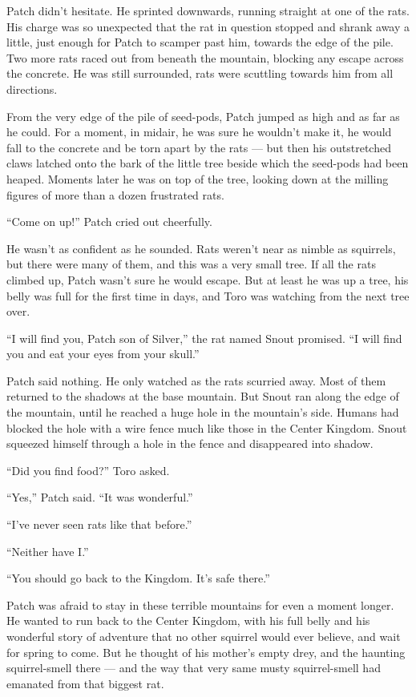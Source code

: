 \documentclass[ebook,oneside,openany,12pt]{memoir}
\begin{document}
Patch didn’t hesitate. He sprinted downwards, running straight at one
of the rats. His charge was so unexpected that the rat in question
stopped and shrank away a little, just enough for Patch to scamper
past him, towards the edge of the pile. Two more rats raced out from
beneath the mountain, blocking any escape across the concrete. He was
still surrounded, rats were scuttling towards him from all directions.

From the very edge of the pile of seed-pods, Patch jumped as high and
as far as he could. For a moment, in midair, he was sure he wouldn’t
make it, he would fall to the concrete and be torn apart by the rats —
but then his outstretched claws latched onto the bark of the little
tree beside which the seed-pods had been heaped. Moments later he was
on top of the tree, looking down at the milling figures of more than a
dozen frustrated rats.

“Come on up!” Patch cried out cheerfully.

He wasn’t as confident as he sounded. Rats weren’t near as nimble as
squirrels, but there were many of them, and this was a very small
tree. If all the rats climbed up, Patch wasn’t sure he would
escape. But at least he was up a tree, his belly was full for the
first time in days, and Toro was watching from the next tree over.

“I will find you, Patch son of Silver,” the rat named Snout
promised. “I will find you and eat your eyes from your skull.”

Patch said nothing. He only watched as the rats scurried away. Most of
them returned to the shadows at the base mountain. But Snout ran along
the edge of the mountain, until he reached a huge hole in the
mountain’s side. Humans had blocked the hole with a wire fence much
like those in the Center Kingdom. Snout squeezed himself through a
hole in the fence and disappeared into shadow.

“Did you find food?” Toro asked.

“Yes,” Patch said. “It was wonderful.”

“I’ve never seen rats like that before.”

“Neither have I.”

“You should go back to the Kingdom. It’s safe there.”

Patch was afraid to stay in these terrible mountains for even a moment
longer. He wanted to run back to the Center Kingdom, with his full
belly and his wonderful story of adventure that no other squirrel
would ever believe, and wait for spring to come. But he thought of his
mother’s empty drey, and the haunting squirrel-smell there — and the
way that very same musty squirrel-smell had emanated from that biggest
rat.
\end{document}
